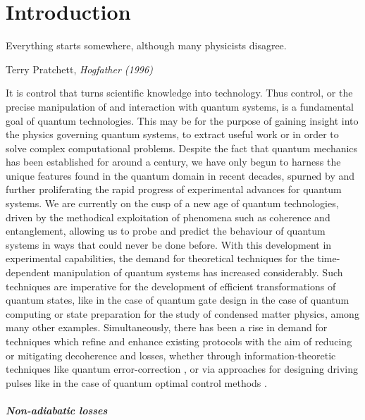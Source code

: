 \chapter{Introduction}

\epigraph{Everything starts somewhere, although many physicists disagree.}{Terry Pratchett, \emph{Hogfather (1996)}}

It is control that turns scientific knowledge into technology. Thus control, or the precise manipulation of and interaction with quantum systems, is a fundamental goal of quantum technologies. This may be for the purpose of gaining insight into the physics governing quantum systems, to extract useful work or in order to solve complex computational problems. Despite the fact that quantum mechanics has been established for around a century, we have only begun to harness the unique features found in the quantum domain in recent decades, spurned by and further proliferating the rapid progress of experimental advances for quantum systems. We are currently on the cusp of a new age of quantum technologies, driven by the methodical exploitation of phenomena such as coherence and entanglement, allowing us to probe and predict the behaviour of quantum systems in ways that could never be done before. With this development in experimental capabilities, the demand for theoretical techniques for the time-dependent manipulation of quantum systems has increased considerably. Such techniques are imperative for the development of efficient transformations of quantum states, like in the case of quantum gate design \cite{pelegri_high-fidelity_2022} in the case of quantum computing or state preparation \cite{dimitrova_many-body_2023} for the study of condensed matter physics, among many other examples. Simultaneously, there has been a rise in demand for techniques which refine and enhance existing protocols with the aim of reducing or mitigating decoherence and losses, whether through information-theoretic techniques like quantum error-correction \cite{roffe_quantum_2019}, or via approaches for designing driving pulses like in the case of quantum optimal control methods \cite{glaser_training_2015, koch_quantum_2022}. 

\paragraph*{Non-adiabatic losses}

